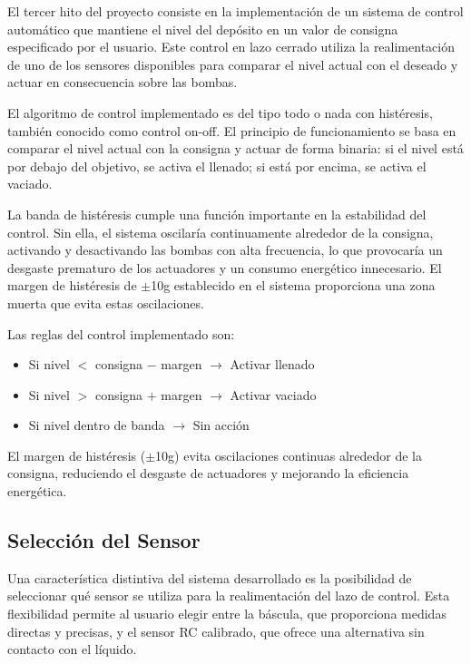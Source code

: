 \documentclass[12pt,a4paper]{article}
\begin{document}
El tercer hito del proyecto consiste en la implementación de un sistema de control automático que mantiene el nivel del depósito en un valor de consigna especificado por el usuario. Este control en lazo cerrado utiliza la realimentación de uno de los sensores disponibles para comparar el nivel actual con el deseado y actuar en consecuencia sobre las bombas.

El algoritmo de control implementado es del tipo todo o nada con histéresis, también conocido como control on-off. El principio de funcionamiento se basa en comparar el nivel actual con la consigna y actuar de forma binaria: si el nivel está por debajo del objetivo, se activa el llenado; si está por encima, se activa el vaciado.

La banda de histéresis cumple una función importante en la estabilidad del control. Sin ella, el sistema oscilaría continuamente alrededor de la consigna, activando y desactivando las bombas con alta frecuencia, lo que provocaría un desgaste prematuro de los actuadores y un consumo energético innecesario. El margen de histéresis de $\pm$10g establecido en el sistema proporciona una zona muerta que evita estas oscilaciones.

Las reglas del control implementado son:

\begin{itemize}
    \item Si nivel $<$ consigna $-$ margen $\rightarrow$ Activar llenado
    \item Si nivel $>$ consigna $+$ margen $\rightarrow$ Activar vaciado  
    \item Si nivel dentro de banda $\rightarrow$ Sin acción
\end{itemize}

El margen de histéresis ($\pm$10g) evita oscilaciones continuas alrededor de la consigna, reduciendo el desgaste de actuadores y mejorando la eficiencia energética.

\subsection{Selección del Sensor}

Una característica distintiva del sistema desarrollado es la posibilidad de seleccionar qué sensor se utiliza para la realimentación del lazo de control. Esta flexibilidad permite al usuario elegir entre la báscula, que proporciona medidas directas y precisas, y el sensor RC calibrado, que ofrece una alternativa sin contacto con el líquido.
\end{document}
